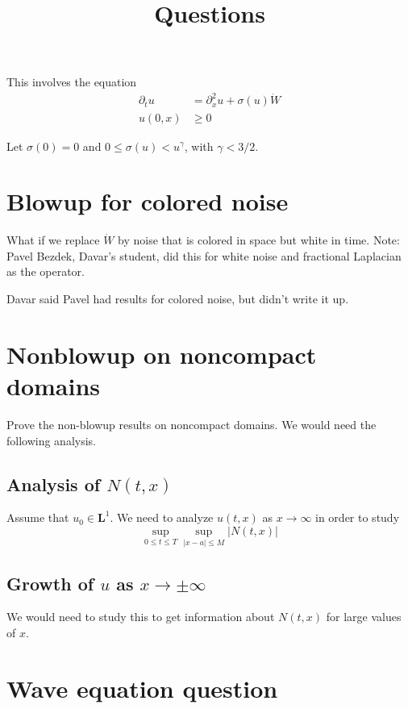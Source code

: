 \documentclass[12pt]{article}
\numberwithin{equation}{section}
\begin{document}
\title{Questions}
\date{}
\maketitle

This involves the equation 
\begin{align}
\label{eq:spde}
\partial_tu&=\partial_x^2u+\sigma(u)\dot{W}  \\
u(0,x)&\geq0  \nonumber
\end{align}

Let $\sigma(0)=0$ and $0\leq\sigma(u)<u^\gamma$, with $\gamma<3/2$.  

\section{Blowup for colored noise}

What if we replace $\dot{W}$ by noise that is colored in space but white in 
time.  Note:  Pavel Bezdek, Davar's student, did this for white noise and 
fractional Laplacian as the operator.  

Davar said Pavel had results for colored noise, but didn't write it up.  

\section{Nonblowup on noncompact domains}

Prove the non-blowup results on noncompact domains.  We would need the 
following analysis.  

\subsection{Analysis of $N(t,x)$}

Assume that $u_0\in\mathbf{L}^1$.  We need to analyze $u(t,x)$ as 
$x\to\infty$ in order to study 
\begin{equation*}
\sup_{0\leq t\leq T}\sup_{|x-a|\leq M}|N(t,x)|
\end{equation*}

\subsection{Growth of $u$ as $x\to\pm\infty$}

We would need to study this to get information about $N(t,x)$ for large 
values of $x$.  

\section{Wave equation question}
\end{document}
